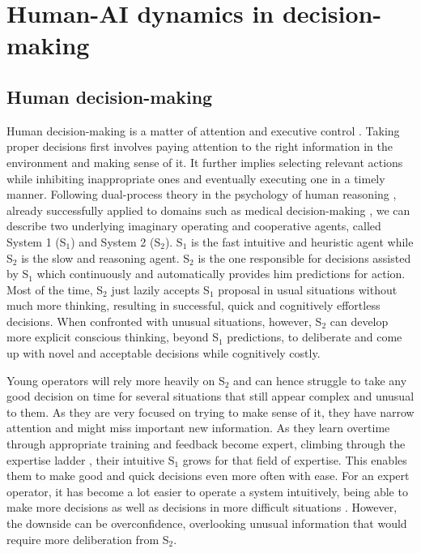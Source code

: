 \documentclass{IOS-Book-Article}
\begin{document}
\section{Human-AI dynamics in decision-making}
\label{sec:humanai_dynamics_in_decision_making}
\subsection{Human decision-making} 
Human decision-making  is a matter of  attention and executive control \cite{naccache2005effortless}. Taking proper decisions first involves paying attention to the right information in the environment and making sense of it. It further implies selecting relevant actions while inhibiting inappropriate ones and eventually executing one in a timely manner. 
Following dual-process theory in the psychology of human reasoning \cite{kahneman2011thinking}, already successfully applied to domains such as medical decision-making \cite{djulbegovic2012dual}, we can describe two underlying imaginary operating and cooperative agents, called System 1 (S$_{1}$) and System 2 (S$_{2}$). S$_{1}$ is the fast intuitive and heuristic agent while S$_{2}$ is the slow and reasoning agent. S$_{2}$ is the one responsible for decisions assisted by S$_{1}$ which continuously and automatically provides him predictions for action. Most of the time, S$_{2}$ just lazily accepts S$_{1}$ proposal in usual situations without much more thinking, resulting in successful, quick and cognitively effortless decisions. When confronted with unusual situations, however, S$_{2}$ can develop more explicit conscious thinking, beyond S$_{1}$ predictions, to deliberate and come up with novel and acceptable decisions while cognitively costly. 

Young operators will rely more heavily on S$_{2}$ and can hence struggle to take any good decision on time for several situations that still appear complex and unusual to them. As they are very focused on trying to make sense of it, they have narrow attention and might miss important new information. As they learn overtime through appropriate training and feedback become expert, climbing through the expertise ladder \cite{stevens2016defining}, their intuitive S$_{1}$ grows for that field of expertise. This enables them to make good and quick decisions even more often with ease. For an expert operator, it has become a lot easier to operate a system intuitively, being able to make more decisions as well as decisions in more difficult situations \cite{EPRI2021}. However, the downside can be overconfidence, overlooking unusual information that would require more deliberation from S$_{2}$.
\end{document}
